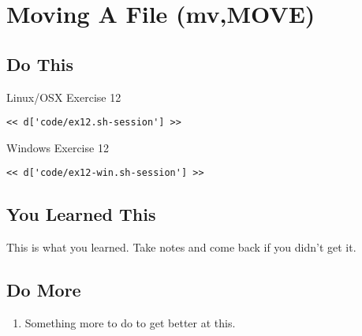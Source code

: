 \chapter{Moving A File (mv,MOVE)}

\section{Do This}

\begin{code}{Linux/OSX Exercise 12}
\begin{Verbatim}
<< d['code/ex12.sh-session'] >>
\end{Verbatim}
\end{code}

\begin{code}{Windows Exercise 12}
\begin{Verbatim}
<< d['code/ex12-win.sh-session'] >>
\end{Verbatim}
\end{code}

\section{You Learned This}

This is what you learned.  Take notes and come back if you didn't get it.

\section{Do More}

\begin{enumerate}
\item Something more to do to get better at this.
\end{enumerate}

